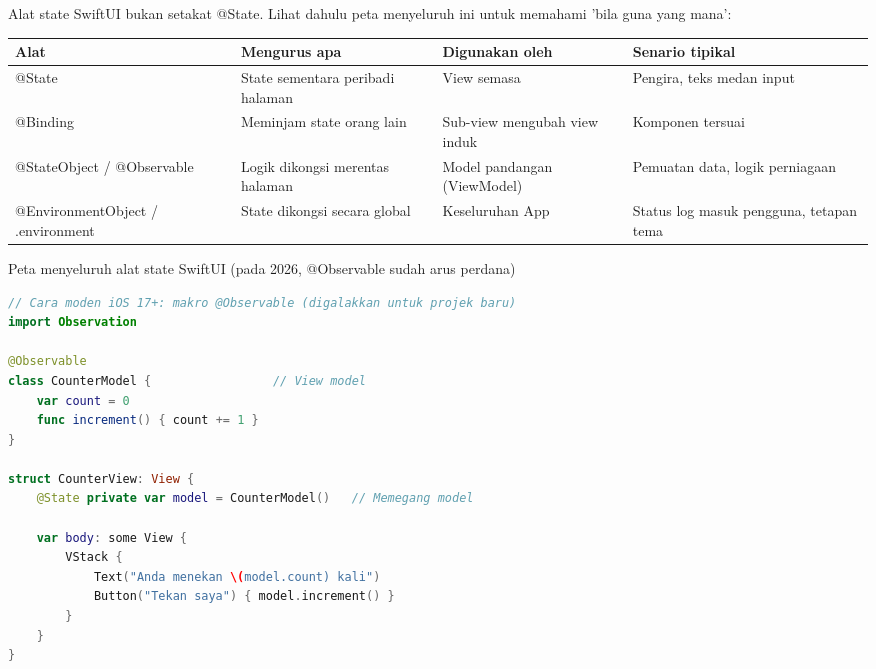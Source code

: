 


Alat state SwiftUI bukan setakat @State. Lihat dahulu peta menyeluruh ini untuk memahami 'bila guna yang mana':

\begin{center}
\begin{tabularx}{\linewidth}{|X|X|X|X|}
\hline
\textbf{Alat} & \textbf{Mengurus apa} & \textbf{Digunakan oleh} & \textbf{Senario tipikal} \tabularnewline
\hline
@State & State sementara peribadi halaman & View semasa & Pengira, teks medan input \tabularnewline
@Binding & Meminjam state orang lain & Sub-view mengubah view induk & Komponen tersuai \tabularnewline
@StateObject / @Observable & Logik dikongsi merentas halaman & Model pandangan (ViewModel) & Pemuatan data, logik perniagaan \tabularnewline
@EnvironmentObject / .environment & State dikongsi secara global & Keseluruhan App & Status log masuk pengguna, tetapan tema \tabularnewline
\hline
\end{tabularx}
\end{center}

\begin{center}\small\color{gray}Peta menyeluruh alat state SwiftUI (pada 2026, @Observable sudah arus perdana)\end{center}

\begin{lstlisting}[language=Swift]
// Cara moden iOS 17+: makro @Observable (digalakkan untuk projek baru)
import Observation

@Observable
class CounterModel {                 // View model
    var count = 0
    func increment() { count += 1 }
}

struct CounterView: View {
    @State private var model = CounterModel()   // Memegang model

    var body: some View {
        VStack {
            Text("Anda menekan \(model.count) kali")
            Button("Tekan saya") { model.increment() }
        }
    }
}
\end{lstlisting}

